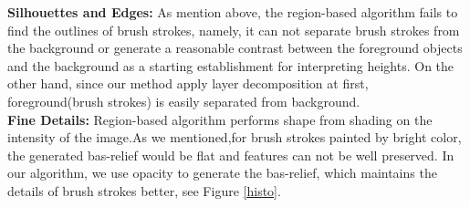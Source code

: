 \textbf{Silhouettes and Edges:} As mention above, the region-based algorithm fails to find the outlines of brush strokes, namely, it can not separate brush strokes from the background or generate a reasonable contrast between the foreground objects and the background as a starting establishment for interpreting heights. On the other hand, since our method apply layer decomposition at first, foreground(brush strokes) is easily separated from background. \\
\textbf{Fine Details:} Region-based algorithm performs shape from shading on the intensity of the image.As we mentioned,for brush strokes painted by bright color, the generated bas-relief would be flat and features can not be well preserved. In our algorithm, we use opacity to generate the bas-relief, which maintains the details of brush strokes better, see Figure \ref{histo}.  \\

 